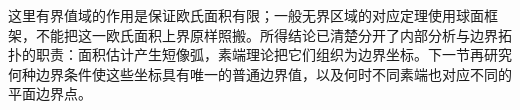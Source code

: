 \ProseParagraphBreak
这里有界值域的作用是保证欧氏面积有限；一般无界区域的对应定理使用球面框架，不能把这一欧氏面积上界原样照搬。所得结论已清楚分开了内部分析与边界拓扑的职责：面积估计产生短像弧，素端理论把它们组织为边界坐标。下一节再研究何种边界条件使这些坐标具有唯一的普通边界值，以及何时不同素端也对应不同的平面边界点。

